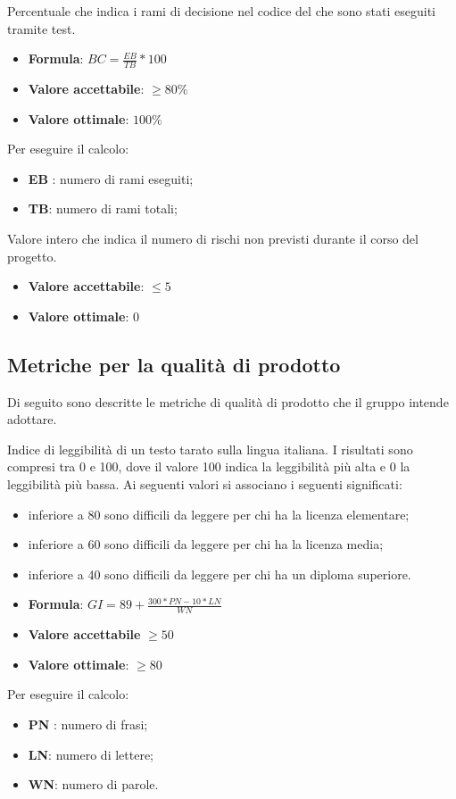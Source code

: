 Percentuale che indica i rami di decisione nel codice del che sono stati eseguiti tramite test.
\begin{itemize}
    \item \textbf{Formula}: $BC = \frac{EB}{TB}*100$
    \item \textbf{Valore accettabile}: $\geq80\%$
    \item \textbf{Valore ottimale}: $100\%$
\end{itemize}  
Per eseguire il calcolo:
\begin{itemize}
    \item \textbf{EB} : numero di rami eseguiti;
    \item \textbf{TB}: numero di rami totali;
\end{itemize}

Valore intero che indica il numero di rischi non previsti durante il corso del progetto.
\begin{itemize}
    \item \textbf{Valore accettabile}: $\leq5$
    \item \textbf{Valore ottimale}: $0$
\end{itemize}  


\pagebreak
\setcounter{M}{0}
\subsection{Metriche per la qualità di prodotto}
Di seguito sono descritte le metriche di qualità di prodotto che il gruppo intende adottare.

Indice di leggibilità di un testo tarato sulla lingua italiana. I risultati sono compresi tra 0 e
100, dove il valore 100 indica la leggibilità più alta e 0 la leggibilità più bassa. Ai seguenti valori si
associano i seguenti significati:
\begin{itemize}
    \item inferiore a 80 sono difficili da leggere per chi ha la licenza elementare;
    \item inferiore a 60 sono difficili da leggere per chi ha la licenza media;
    \item inferiore a 40 sono difficili da leggere per chi ha un diploma superiore.
\end{itemize}
\begin{itemize}
    \item \textbf{Formula}: $GI=89+\frac{300*PN-10*LN}{WN}$
    \item \textbf{Valore accettabile} $\geq50$
    \item \textbf{Valore ottimale}: $\geq80$
\end{itemize}  
Per eseguire il calcolo:
\begin{itemize}
    \item \textbf{PN} : numero di frasi;
    \item \textbf{LN}: numero di lettere;
    \item \textbf{WN}: numero di parole.
\end{itemize}

